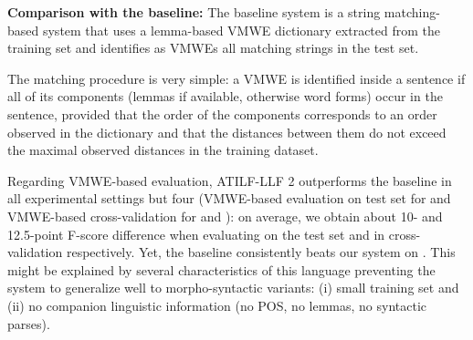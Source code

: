 \documentclass[output=paper,modfonts]{langscibook}
\begin{document}
\textbf{Comparison with the baseline:}
The baseline system is a string matching-based system that uses a lemma-based VMWE dictionary extracted from the training set and identifies as VMWEs all matching strings in the test set. 

The matching procedure is very simple: a VMWE is identified inside a sentence if all of its components (lemmas if available, otherwise word forms) occur in the sentence, provided that the order of the components corresponds to an order observed in the dictionary and that the distances between them do not exceed the maximal observed distances in the training dataset.

\newpage 
Regarding VMWE-based evaluation, ATILF-LLF 2 outperforms the baseline in all experimental settings but four (VMWE-based  evaluation on test set for  and VMWE-based cross-validation for  and ): on average, we obtain about 10- and 12.5-point F-score difference when evaluating on the test set and in cross-validation respectively. Yet, the baseline consistently beats our system on . This might be explained by several characteristics of this language preventing the system to generalize well to morpho-syntactic variants: (i) small training set and (ii) no companion linguistic information (no POS, no lemmas, no syntactic parses).
\end{document}
